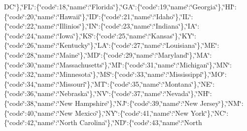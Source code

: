 \begin{DoxyCompactItemize}
D\-C\char`\"{}\},\char`\"{}F\-L\char`\"{}\-:\{\char`\"{}code\char`\"{}\-:18,\char`\"{}name\char`\"{}\-:\char`\"{}Florida\char`\"{}\},\char`\"{}G\-A\char`\"{}\-:\{\char`\"{}code\char`\"{}\-:19,\char`\"{}name\char`\"{}\-:\char`\"{}Georgia\char`\"{}\},\char`\"{}H\-I\char`\"{}\-:\{\char`\"{}code\char`\"{}\-:20,\char`\"{}name\char`\"{}\-:\char`\"{}Hawaii\char`\"{}\},\char`\"{}I\-D\char`\"{}\-:\{\char`\"{}code\char`\"{}\-:21,\char`\"{}name\char`\"{}\-:\char`\"{}Idaho\char`\"{}\},\char`\"{}I\-L\char`\"{}\-:\{\char`\"{}code\char`\"{}\-:22,\char`\"{}name\char`\"{}\-:\char`\"{}Illinios\char`\"{}\},\char`\"{}I\-N\char`\"{}\-:\{\char`\"{}code\char`\"{}\-:23,\char`\"{}name\char`\"{}\-:\char`\"{}Indiana\char`\"{}\},\char`\"{}I\-A\char`\"{}\-:\{\char`\"{}code\char`\"{}\-:24,\char`\"{}name\char`\"{}\-:\char`\"{}Iowa\char`\"{}\},\char`\"{}K\-S\char`\"{}\-:\{\char`\"{}code\char`\"{}\-:25,\char`\"{}name\char`\"{}\-:\char`\"{}Kansas\char`\"{}\},\char`\"{}K\-Y\char`\"{}\-:\{\char`\"{}code\char`\"{}\-:26,\char`\"{}name\char`\"{}\-:\char`\"{}Kentucky\char`\"{}\},\char`\"{}L\-A\char`\"{}\-:\{\char`\"{}code\char`\"{}\-:27,\char`\"{}name\char`\"{}\-:\char`\"{}Louisiana\char`\"{}\},\char`\"{}M\-E\char`\"{}\-:\{\char`\"{}code\char`\"{}\-:28,\char`\"{}name\char`\"{}\-:\char`\"{}Maine\char`\"{}\},\char`\"{}M\-D\char`\"{}\-:\{\char`\"{}code\char`\"{}\-:29,\char`\"{}name\char`\"{}\-:\char`\"{}Maryland\char`\"{}\},\char`\"{}M\-A\char`\"{}\-:\{\char`\"{}code\char`\"{}\-:30,\char`\"{}name\char`\"{}\-:\char`\"{}Massachusetts\char`\"{}\},\char`\"{}M\-I\char`\"{}\-:\{\char`\"{}code\char`\"{}\-:31,\char`\"{}name\char`\"{}\-:\char`\"{}Michigan\char`\"{}\},\char`\"{}M\-N\char`\"{}\-:\{\char`\"{}code\char`\"{}\-:32,\char`\"{}name\char`\"{}\-:\char`\"{}Minnesota\char`\"{}\},\char`\"{}M\-S\char`\"{}\-:\{\char`\"{}code\char`\"{}\-:33,\char`\"{}name\char`\"{}\-:\char`\"{}Mississippi\char`\"{}\},\char`\"{}M\-O\char`\"{}\-:\{\char`\"{}code\char`\"{}\-:34,\char`\"{}name\char`\"{}\-:\char`\"{}Missouri\char`\"{}\},\char`\"{}M\-T\char`\"{}\-:\{\char`\"{}code\char`\"{}\-:35,\char`\"{}name\char`\"{}\-:\char`\"{}Montana\char`\"{}\},\char`\"{}N\-E\char`\"{}\-:\{\char`\"{}code\char`\"{}\-:36,\char`\"{}name\char`\"{}\-:\char`\"{}Nebraska\char`\"{}\},\char`\"{}N\-V\char`\"{}\-:\{\char`\"{}code\char`\"{}\-:37,\char`\"{}name\char`\"{}\-:\char`\"{}Nevada\char`\"{}\},\char`\"{}N\-H\char`\"{}\-:\{\char`\"{}code\char`\"{}\-:38,\char`\"{}name\char`\"{}\-:\char`\"{}New Hampshire\char`\"{}\},\char`\"{}N\-J\char`\"{}\-:\{\char`\"{}code\char`\"{}\-:39,\char`\"{}name\char`\"{}\-:\char`\"{}New Jersey\char`\"{}\},\char`\"{}N\-M\char`\"{}\-:\{\char`\"{}code\char`\"{}\-:40,\char`\"{}name\char`\"{}\-:\char`\"{}New Mexico\char`\"{}\},\char`\"{}N\-Y\char`\"{}\-:\{\char`\"{}code\char`\"{}\-:41,\char`\"{}name\char`\"{}\-:\char`\"{}New York\char`\"{}\},\char`\"{}N\-C\char`\"{}\-:\{\char`\"{}code\char`\"{}\-:42,\char`\"{}name\char`\"{}\-:\char`\"{}North Carolina\char`\"{}\},\char`\"{}N\-D\char`\"{}\-:\{\char`\"{}code\char`\"{}\-:43,\char`\"{}name\char`\"{}\-:\char`\"{}North 
\end{DoxyCompactItemize}
